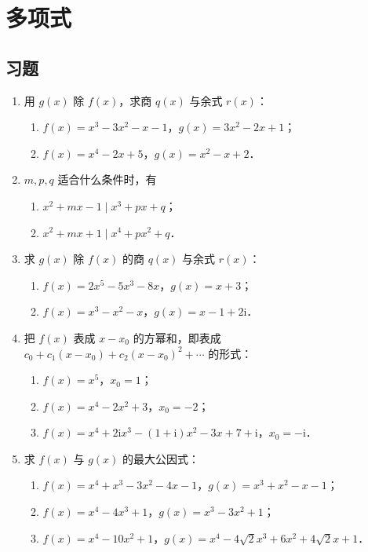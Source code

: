 \chapter{多项式}
\section{习题}
\begin{enumerate}
  \item 用 $g(x)$ 除 $f(x)$，求商 $q(x)$ 与余式 $r(x)$：
  \begin{enumerate}
    \item $f(x)=x^3-3x^2-x-1$，$g(x)=3x^2-2x+1$；
  \anssub
    \item $f(x)=x^4-2x+5$，$g(x)=x^2-x+2$．
  \anssub
  \end{enumerate}
  \item $m,p,q$ 适合什么条件时，有
  \begin{enumerate}
    \item $x^2+mx-1\mid x^3+px+q$；
  \anssub
    \item $x^2+mx+1\mid x^4+px^2+q$．
  \anssub
  \end{enumerate}
  \item 求 $g(x)$ 除 $f(x)$ 的商 $q(x)$ 与余式 $r(x)$：
  \begin{enumerate}
    \item $f(x)=2x^5-5x^3-8x$，$g(x)=x+3$；
  \anssub
    \item $f(x)=x^3-x^2-x$，$g(x)=x-1+2\mathrm{i}$．
  \anssub
  \end{enumerate}
  \item 把 $f(x)$ 表成 $x-x_0$ 的方幂和，即表成 $c_0+c_1(x-x_0)+c_2(x-x_0)^2+\cdots$ 的形式：
  \begin{enumerate}
    \item $f(x)=x^5$，$x_0=1$；
  \anssub
    \item $f(x)=x^4-2x^2+3$，$x_0=-2$；
  \anssub
    \item $f(x)=x^4+2\mathrm{i}x^3-(1+\mathrm{i})x^2-3x+7+\mathrm{i}$，$x_0=-\mathrm{i}$．
  \anssub
  \end{enumerate}
  \item 求 $f(x)$ 与 $g(x)$ 的最大公因式：
  \begin{enumerate}
    \item $f(x)=x^4+x^3-3x^2-4x-1$，$g(x)=x^3+x^2-x-1$；
  \anssub
    \item $f(x)=x^4-4x^3+1$，$g(x)=x^3-3x^2+1$；
  \anssub
    \item $f(x)=x^4-10x^2+1$，$g(x)=x^4-4\sqrt{2}x^3+6x^2+4\sqrt{2}x+1$．

\end{enumerate}
\end{enumerate}
